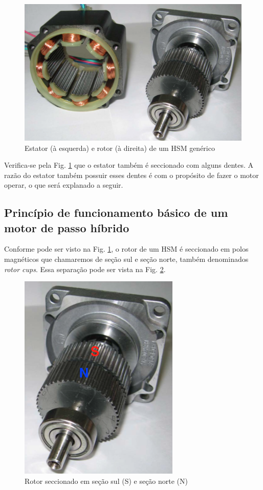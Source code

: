 	\begin{figure}[!h]
		\centering
		\includegraphics[scale=.4]{Images/hsmreal2.png}
		\caption{Estator (à esquerda) e rotor (à direita) de um HSM genérico \cite{ieeeRusso}}
		\label{HSMestatorrotor}
	\end{figure} 
	
	Verifica-se pela Fig. \ref{HSMestatorrotor} que o estator também é seccionado com alguns dentes. A razão do estator também possuir esses dentes é com o propósito de fazer o motor operar, o que será explanado a seguir.
	
	\subsection{Princípio de funcionamento básico de um motor de passo híbrido}
	
	Conforme pode ser visto na Fig. \ref{HSMestatorrotor}, o rotor de um HSM é seccionado em polos magnéticos que chamaremos de seção sul e seção norte, também denominados \textit{rotor cups}. Essa separação pode ser vista na Fig. \ref{rotorsec}.
	
	\begin{figure}[!h]
		\centering 
		\includegraphics[scale=0.45]{images/hsm_operation/hsmrotorreal}
		\caption{Rotor seccionado em seção sul (S) e seção norte (N) \cite{ieeeRusso}}
		\label{rotorsec}
	\end{figure}
	
